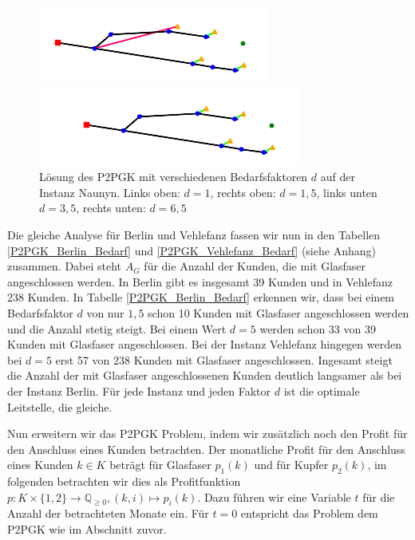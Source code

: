 \documentclass[11pt,a4paper]{article}
\newcommand{\Q}{\mathbb{Q}}
\theoremstyle{my_th_style1}
\begin{document}
\begin{figure}[h]
\begin{minipage}[b]{0.4\textwidth}
		\includegraphics[width=\textwidth]{./Bilder/P2PGK_Naunyn_demand3_5_duration0}
	\end{minipage}
	\begin{minipage}[b]{0.4\textwidth}
		\includegraphics[width=\textwidth]{./Bilder/P2PGK_Naunyn_demand6_5_duration0}
	\end{minipage}
	\caption{Lösung des P2PGK mit verschiedenen Bedarfsfaktoren $d$ auf der Instanz Naunyn. Links oben: $d=1$, rechts oben: $d=1,5$, links unten $d=3,5$, rechts unten: $d=6,5$}
	\label{P2PGK_Naunyn_Bedarf}
\end{figure}

Die gleiche Analyse für Berlin und Vehlefanz fassen wir nun in den Tabellen \eqref{P2PGK_Berlin_Bedarf} und \eqref{P2PGK_Vehlefanz_Bedarf} (siehe Anhang) zusammen.
Dabei steht $A_G$ für die Anzahl der Kunden, die mit Glasfaser angeschlossen werden.
In Berlin gibt es insgesamt 39 Kunden und in Vehlefanz 238 Kunden.
In Tabelle \eqref{P2PGK_Berlin_Bedarf} erkennen wir, dass  bei einem Bedarfsfaktor $d$ von nur $1,5$ schon 10 Kunden mit Glasfaser angeschlossen werden und die Anzahl stetig steigt.
Bei einem Wert $d=5$ werden schon 33 von 39 Kunden mit Glasfaser angeschlossen.
Bei der Instanz Vehlefanz hingegen werden bei $d=5$ erst 57 von 238 Kunden mit Glasfaser angeschlossen. 
Ingesamt steigt die Anzahl der mit Glasfaser angeschlossenen Kunden deutlich langsamer als bei der Instanz Berlin.
Für jede Instanz und jeden Faktor $d$ ist die optimale Leitstelle, die gleiche.

Nun erweitern wir das P2PGK Problem, indem wir zusätzlich noch den Profit für den Anschluss eines Kunden betrachten.
Der monatliche Profit für den Anschluss eines Kunden $k \in K$ beträgt für Glasfaser $p_1(k)$ und für Kupfer $p_2(k)$, im folgenden betrachten wir dies als Profitfunktion $p:K \times \{1,2\} \rightarrow \Q_{ \geq 0 },(k,i) \mapsto p_i(k)$.
Dazu führen wir eine Variable $t$ für die Anzahl der betrachteten Monate ein.
Für $t=0$ entspricht das Problem dem P2PGK wie im Abschnitt zuvor.
\end{document}

